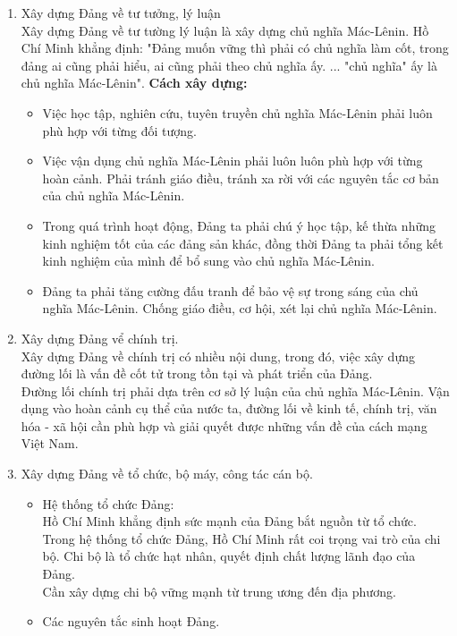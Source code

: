 \documentclass{article}
\begin{document}
	\begin{enumerate}
		\item Xây dựng Đảng về tư tưởng, lý luận\\
		Xây dựng Đảng về tư tường lý luận là xây dựng chủ nghĩa Mác-Lênin. Hồ Chí Minh khẳng định: "Đảng muốn vững thì phải có chủ nghĩa làm cốt, trong đảng ai cũng phải hiểu, ai cũng phải theo chủ nghĩa ấy. ... "chủ nghĩa" ấy là chủ nghĩa Mác-Lênin".
		\textbf{Cách xây dựng:}
		\begin{itemize}
			\item Việc học tập, nghiên cứu, tuyên truyền chủ nghĩa Mác-Lênin phải luôn phù hợp với từng đối tượng.
			\item Việc vận dụng chủ nghĩa Mác-Lênin phải luôn luôn phù hợp với từng hoàn cảnh. Phải tránh giáo điều, tránh xa rời với các nguyên tắc cơ bản của chủ nghĩa Mác-Lênin.
			\item Trong quá trình hoạt động, Đảng ta phải chú ý học tập, kế thừa những kinh nghiệm tốt của các đảng sản khác, đồng thời Đảng ta phải tổng kết kinh nghiệm của mình để bổ sung vào chủ nghĩa Mác-Lênin.
			\item Đảng ta phải tăng cường đấu tranh để bảo vệ sự trong sáng của chủ nghĩa Mác-Lênin. Chống giáo điều, cơ hội, xét lại chủ nghĩa Mác-Lênin.
		\end{itemize}
		\item Xây dựng Đảng vể chính trị.\\
		Xây dựng Đảng về chính trị có nhiều nội dung, trong đó, việc xây dựng đường lối là vấn đề cốt tử trong tồn tại và phát triển của Đảng.\\
		Đường lối chính trị phải dựa trên cơ sở lý luận của chủ nghĩa Mác-Lênin. Vận dụng vào hoàn cảnh cụ thể của nước ta, đường lối về kinh tế, chính trị, văn hóa - xã hội cần phù hợp và giải quyết được những vấn đề của cách mạng Việt Nam.
		\item Xây dựng Đảng về tổ chức, bộ máy, công tác cán bộ.
		\begin{itemize}
			\item Hệ thống tổ chức Đảng:\\
			Hồ Chí Minh khẳng định sức mạnh của Đảng bắt nguồn từ tổ chức.\\
			Trong hệ thống tổ chức Đảng, Hồ Chí Minh rất coi trọng vai trò của chi bộ. Chi bộ là tổ chức hạt nhân, quyết định chất lượng lãnh đạo của Đảng.\\
			Cần xây dựng chi bộ vững mạnh từ trung ương đến địa phương.
			\item Các nguyên tắc sinh hoạt Đảng.\\

\end{itemize}
\end{enumerate}
\end{document}
